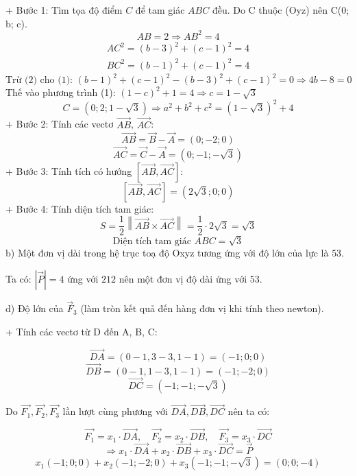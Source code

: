 \documentclass[a4paper,12pt]{article}
\begin{document}
+ Bước 1: Tìm tọa độ điểm \(C\) để tam giác \(ABC\) đều.
Do C thuộc (Oyz) nên C(0; b; c).
\[ AB = 2 \Rightarrow AB^2 = 4 \]
\begin{align}
AC^2 = (b - 3)^2 + (c - 1)^2 = 4 \tag{1} \\
BC^2 = (b - 1)^2 + (c - 1)^2 = 4 \tag{2}
\end{align}
\[\text{Trừ (2) cho (1): }(b - 1)^2 + (c - 1)^2 - (b - 3)^2 + (c - 1)^2 = 0 \Rightarrow 4 b - 8 = 0\]
Thế vào phương trình (1): \(\left(1 - c\right)^{2} + 1 = 4 \Rightarrow c=1 - \sqrt{3}\)
\[C = (0; 2; 1 - \sqrt{3}) \Rightarrow a^2+b^2+c^2=\left(1 - \sqrt{3}\right)^{2} + 4\]
+ Bước 2: Tính các vectơ \(\overrightarrow{AB}\), \(\overrightarrow{AC}\):
\[ \overrightarrow{AB} = \overrightarrow{B} - \overrightarrow{A} = (0; -2; 0) \]
\[ \overrightarrow{AC} = \overrightarrow{C} - \overrightarrow{A} = (0; -1; - \sqrt{3}) \]
+ Bước 3: Tính tích có hướng \(\left[\overrightarrow{AB}, \overrightarrow{AC}\right]\):
\[ [\overrightarrow{AB},  \overrightarrow{AC}] = (2 \sqrt{3}; 0; 0) \]
+ Bước 4: Tính diện tích tam giác:
\[
S = \frac{1}{2} \left\| \overrightarrow{AB} \times \overrightarrow{AC} \right\| = \frac{1}{2} \cdot 2 \sqrt{3}
= \sqrt{3}
\]
\[\text{Diện tích tam giác } ABC = \sqrt{3}\]
b) Một đơn vị dài trong hệ trục toạ độ Oxyz tương ứng với độ lớn của lực là \(53\).


Ta có: \(|\overrightarrow{P}| = 4\) ứng với \(212\) nên một đơn vị độ dài ứng với \(53\).




d) Độ lớn của \(\overrightarrow{F}_3\) (làm tròn kết quả đến hàng đơn vị khi tính theo newton).


+ Tính các vectơ từ D đến A, B, C:


\[ \overrightarrow{DA} = (0 - 1, 3 - 3, 1 - 1) = (-1; 0; 0) \]
\[ \overrightarrow{DB} = (0 - 1, 1 - 3, 1 - 1) = (-1; -2; 0) \]
\[ \overrightarrow{DC} = (-1; -1; - \sqrt{3}) \]


Do \(\overrightarrow{F_1},\overrightarrow{F_2}, \overrightarrow{F_3}\) lần lượt cùng phương với \(\overrightarrow{DA}, \overrightarrow{DB}, \overrightarrow{DC}\) nên ta có:


\[ \overrightarrow{F_1} = x_1 \cdot \overrightarrow{DA},\quad \overrightarrow{F_2} = x_2 \cdot \overrightarrow{DB},\quad \overrightarrow{F_3} = x_3 \cdot \overrightarrow{DC} \]
\[ \Rightarrow x_1 \cdot \overrightarrow{DA} + x_2 \cdot \overrightarrow{DB} + x_3 \cdot \overrightarrow{DC} = \overrightarrow{P} \]
\[ x_1(-1; 0; 0) + x_2(-1; -2; 0) + x_3(-1; -1; - \sqrt{3}) = (0; 0; -4) \]
\end{document}
